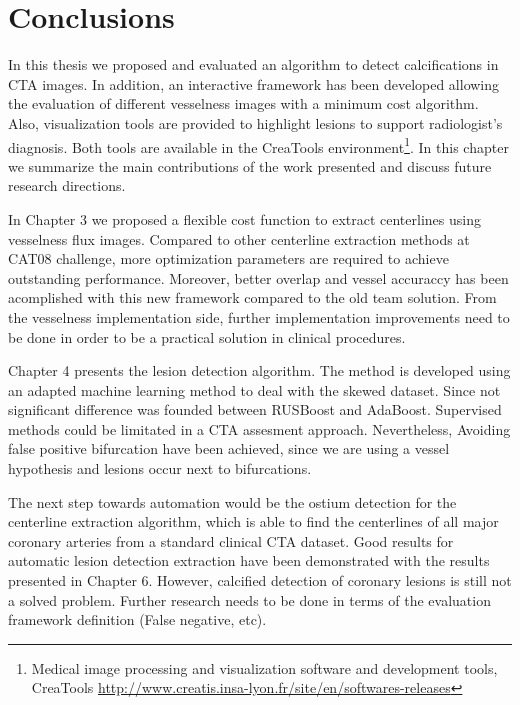 \chapter{Conclusions}\label{conc:conc}

In this thesis we proposed and evaluated an algorithm to detect calcifications in CTA images. In addition, an interactive framework has been developed allowing the evaluation of different vesselness images with a minimum cost algorithm. Also, visualization tools are provided to highlight lesions to support radiologist's diagnosis. Both tools are available in the CreaTools environment\footnote{Medical image processing and visualization software and development tools, CreaTools \href{http://www.creatis.insa-lyon.fr/site/en/softwares-releases}{http://www.creatis.insa-lyon.fr/site/en/softwares-releases}}. In this chapter we summarize the main contributions of the work presented and discuss future research directions.

In Chapter 3 we proposed a flexible cost function to extract centerlines using vesselness flux images. Compared to other centerline extraction methods at CAT08 challenge, more optimization parameters are required to achieve outstanding performance. Moreover, better overlap and vessel accuraccy has been acomplished with this new framework compared to the old team solution. From the vesselness implementation side, further implementation improvements need to be done in order to be a practical solution in clinical procedures.

Chapter 4 presents the lesion detection algorithm. The method is developed using an adapted machine learning method to deal with the skewed dataset. Since not significant difference was founded between RUSBoost and AdaBoost. Supervised methods could be limitated in a CTA assesment approach. Nevertheless, Avoiding false positive bifurcation have been achieved, since we are using a vessel hypothesis and lesions occur next to bifurcations.

The next step towards automation would be the ostium detection for the centerline extraction algorithm, which is able to find the centerlines of all major coronary arteries from a standard clinical CTA dataset. 
Good results for automatic lesion detection extraction have been demonstrated with the results presented in Chapter 6. However, calcified detection of coronary lesions is still not a solved problem. Further research needs to be done in terms of the evaluation framework definition (False negative, etc).
